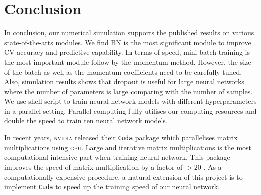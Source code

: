 \section{Conclusion}
In conclusion, our numerical simulation supports the published results on various state-of-the-arts modules. We find BN is the most significant module to improve CV accuracy and predictive capability. In terms of speed, mini-batch training is the most important module follow by the momentum method. However, the size of the batch as well as the momentum coefficients need to be carefully tuned. Also, simulation results shows that dropout is useful for large neural networks where the number of parameters is large comparing with the number of samples. We use shell script to train neural network models with different hyperparameters in a parallel setting. Parallel computing fully utilises our computing resources and double the speed to train ten neural network models.

In recent years, \textsc{nvidia} released their \href{https://developer.nvidia.com/cuda-zone}{\texttt{Cuda}} package which parallelises matrix multiplications using \textsc{gpu}. Large and iterative matrix multiplications is the most computational intensive part when training neural network, This package improves the speed of matrix multiplication by a factor of $>20$ \citep{5452452}. As a computationally expensive procedure, a natural extension of this project is to implement \href{https://developer.nvidia.com/cuda-zone}{\texttt{Cuda}} to speed up the training speed of our neural network.  